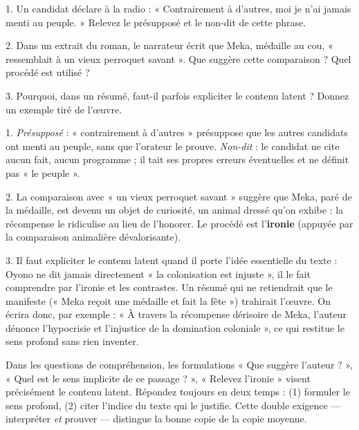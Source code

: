\documentclass[11pt]{article}
\begin{document}
\begin{exercice}
1. Un candidat déclare à la radio : « Contrairement à d'autres, moi je n'ai jamais menti au peuple. » Relevez le présupposé et le non-dit de cette phrase.\par
2. Dans un extrait du roman, le narrateur écrit que Meka, médaille au cou, « ressemblait à un vieux perroquet savant ». Que suggère cette comparaison ? Quel procédé est utilisé ?\par
3. Pourquoi, dans un résumé, faut-il parfois expliciter le contenu latent ? Donnez un exemple tiré de l'œuvre.
\end{exercice}

\begin{corrige}
1. \emph{Présupposé} : « contrairement à d'autres » présuppose que les autres candidats ont menti au peuple, sans que l'orateur le prouve. \emph{Non-dit} : le candidat ne cite aucun fait, aucun programme ; il tait ses propres erreurs éventuelles et ne définit pas « le peuple ».\par
2. La comparaison avec « un vieux perroquet savant » suggère que Meka, paré de la médaille, est devenu un objet de curiosité, un animal dressé qu'on exhibe : la récompense le ridiculise au lieu de l'honorer. Le procédé est l'\textbf{ironie} (appuyée par la comparaison animalière dévalorisante).\par
3. Il faut expliciter le contenu latent quand il porte l'idée essentielle du texte : Oyono ne dit jamais directement « la colonisation est injuste », il le fait comprendre par l'ironie et les contrastes. Un résumé qui ne retiendrait que le manifeste (« Meka reçoit une médaille et fait la fête ») trahirait l'œuvre. On écrira donc, par exemple : « À travers la récompense dérisoire de Meka, l'auteur dénonce l'hypocrisie et l'injustice de la domination coloniale », ce qui restitue le sens profond sans rien inventer.
\end{corrige}

\begin{aretenir}
Dans les questions de compréhension, les formulations « Que suggère l'auteur ? », « Quel est le sens implicite de ce passage ? », « Relevez l'ironie » visent précisément le contenu latent. Répondez toujours en deux temps : (1) formuler le sens profond, (2) citer l'indice du texte qui le justifie. Cette double exigence — interpréter \emph{et} prouver — distingue la bonne copie de la copie moyenne.
\end{aretenir}
\end{document}
